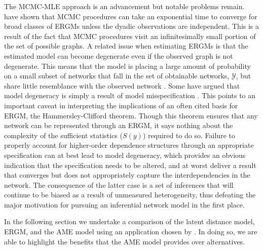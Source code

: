 \documentclass[12pt,pdflatex]{elsarticle}
\begin{document}
\nocite{hammersley:clifford:1971}
The MCMC-MLE approach is an advancement but notable problems remain. \citet{chatterjee:diaconis:2013} have shown that MCMC procedures can take an exponential time to converge for broad classes of ERGMs unless the dyadic observations are independent. This is a result of the fact that MCMC procedures visit an infinitesimally small portion of the set of possible graphs. A related issue when estimating ERGMs is that the estimated model can become degenerate even if the observed graph is not degenerate. This means that the model is placing a large amount of probability on a small subset of networks that fall in the set of obtainable networks, $\mathcal{Y}$, but share little resemblance with the observed network \citep{schweinberger:2011}.
Some have argued that model degeneracy is simply a result of model misspecification \citep{goodreau:etal:2008,handcock:etal:2008}. This points to an important caveat in interpreting the implications of an often cited basis for ERGM, the Hammersley-Clifford theorem. Though this theorem ensures that any network can be represented through an ERGM, it says nothing about the complexity of the sufficient statistics ($S(y)$) required to do so. Failure to properly account for higher-order dependence structures through an appropriate specification can at best lead to model degeneracy, which provides an obvious indication that the specification needs to be altered, and at worst deliver a result that converges but does not appropriately capture the interdependencies in the network. The consequence of the latter case is a set of inferences that will continue to be biased as a result of unmeasured heterogeneity, thus defeating the major motivation for pursuing an inferential network model in the first place.%

In the following section we undertake a comparison of the latent distance model, ERGM, and the AME model using an application chosen by \citet{cranmer:etal:2016}.%
In doing so, we are able to highlight the benefits that the AME model provides over alternatives.
\end{document}
